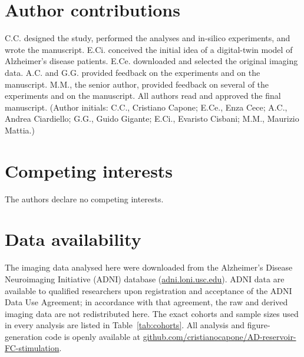 \documentclass[11pt]{article}
\begin{document}
\section*{Author contributions}
C.C. designed the study, performed the analyses and in-silico experiments, and
wrote the manuscript. E.Ci. conceived the initial idea of a digital-twin model of
Alzheimer's disease patients. E.Ce. downloaded and selected the original imaging
data. A.C. and G.G. provided feedback on the experiments and on the manuscript.
M.M., the senior author, provided feedback on several of the experiments and on
the manuscript. All authors read and approved the final manuscript.
(Author initials: C.C., Cristiano Capone; E.Ce., Enza Cece; A.C., Andrea
Ciardiello; G.G., Guido Gigante; E.Ci., Evaristo Cisbani; M.M., Maurizio Mattia.)

\section*{Competing interests}
The authors declare no competing interests.


\section*{Data availability}
The imaging data analysed here were downloaded from the Alzheimer's Disease
Neuroimaging Initiative (ADNI) database
(\href{https://adni.loni.usc.edu}{adni.loni.usc.edu}). ADNI data are available
to qualified researchers upon registration and acceptance of the ADNI Data Use
Agreement; in accordance with that agreement, the raw and derived imaging data
are not redistributed here. The exact cohorts and sample sizes used in every
analysis are listed in Table~\ref{tab:cohorts}. All analysis and
figure-generation code is openly available at
\href{https://github.com/cristianocapone/AD-reservoir-FC-stimulation}%
{github.com/cristianocapone/AD-reservoir-FC-stimulation}.

\clearpage


\end{document}
